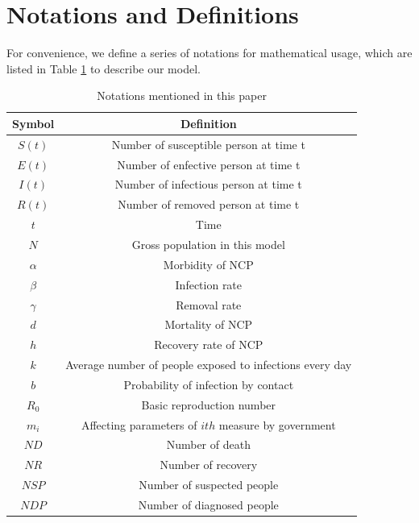 \documentclass{mcmthesis}
\begin{document}
\section{Notations and Definitions}\label{S3}
    For convenience, we define a series of notations for mathematical usage, which are listed in Table \ref{notation} to describe our model.
\begin{table}[H]\normalsize
    \centering
    \caption{Notations mentioned in this paper}
    \label{notation}
    \begin{tabular}{c c}
\toprule[2pt]
        Symbol & Definition\\
\hline
    $S(t)$ & Number of susceptible person at time t\\
    $E(t)$ & Number of enfective person at time t\\
    $I(t)$ & Number of infectious person at time t\\
    $R(t)$ & Number of removed person at time t\\
    $t$ & Time\\
    $N$ & Gross population in this model\\
    $\alpha$ & Morbidity of NCP\\
    $\beta$ & Infection rate\\
    $\gamma$ & Removal rate\\
    $d$ & Mortality of NCP\\
    $h$ & Recovery rate of NCP\\
    $k$ & Average number of people exposed to infections every day \\
    $b$ & Probability of infection by contact\\
    $R_0$ & Basic reproduction number\\
    $m_i$ & Affecting parameters of $ith$ measure by government \\
    $ND$ & Number of death\\
    $NR$ & Number of recovery\\
    $NSP$ & Number of suspected people\\
    $NDP$ & Number of diagnosed people\\
\bottomrule[2pt]
    \end{tabular}
\end{table}
\end{document}
